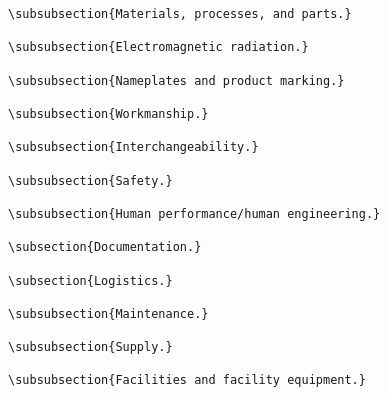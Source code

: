 \begin{itemize}
\begin{small}
\begin{verbatim}
\subsubsection{Materials, processes, and parts.}

\subsubsection{Electromagnetic radiation.}

\subsubsection{Nameplates and product marking.}

\subsubsection{Workmanship.}

\subsubsection{Interchangeability.}

\subsubsection{Safety.}

\subsubsection{Human performance/human engineering.}

\subsection{Documentation.}

\subsection{Logistics.}

\subsubsection{Maintenance.}

\subsubsection{Supply.}

\subsubsection{Facilities and facility equipment.}


\end{verbatim}
\end{small}
\end{itemize}
